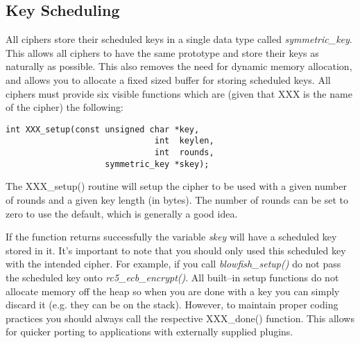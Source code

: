 \documentclass[synpaper]{book}
\begin{document}
\subsection{Key Scheduling}
All ciphers store their scheduled keys in a single data type called \textit{symmetric\_key}.  This allows all ciphers to
have the same prototype and store their keys as naturally as possible.  This also removes the need for dynamic memory
allocation, and allows you to allocate a fixed sized buffer for storing scheduled keys.  All ciphers must provide six visible
functions which are (given that XXX is the name of the cipher) the following:
\begin{verbatim}
int XXX_setup(const unsigned char *key,
                              int  keylen,
                              int  rounds,
                    symmetric_key *skey);
\end{verbatim}

The XXX\_setup() routine will setup the cipher to be used with a given number of rounds and a given key length (in bytes).
The number of rounds can be set to zero to use the default, which is generally a good idea.

If the function returns successfully the variable \textit{skey} will have a scheduled key stored in it.  It's important to note
that you should only used this scheduled key with the intended cipher.  For example, if you call \textit{blowfish\_setup()} do not
pass the scheduled key onto \textit{rc5\_ecb\_encrypt()}.  All built--in setup functions do not allocate memory off the heap so
when you are done with a key you can simply discard it (e.g. they can be on the stack).  However, to maintain proper coding
practices you should always call the respective XXX\_done() function.  This allows for quicker porting to applications with
externally supplied plugins.
\end{document}

